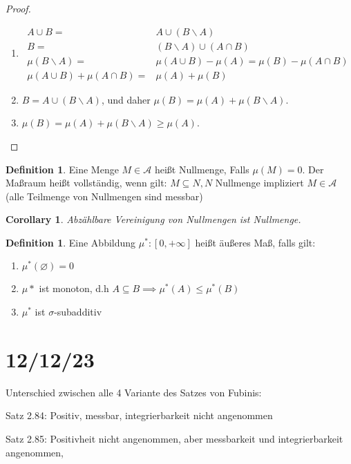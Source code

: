 \documentclass[prb,12pt]{revtex4-2}
\newtheorem{Corollary}[Theorem]{Corollary}
\theoremstyle{definition}
\theoremstyle{definition}
\newtheorem{Definition}[Theorem]{Definition}
\begin{document}
\begin{proof}
	\begin{enumerate}
		\item 
			\begin{align*}
				A \cup B=&A\cup(B\backslash A)\\
				B =& (B\backslash A)\cup (A \cap B)\\
				\mu(B\backslash A)=&\mu(A\cup B)-\mu(A)=\mu(B)-\mu(A \cap B)\\
				\mu(A\cup B)+\mu(A\cap B)=& \mu(A)+\mu(B)
			\end{align*}
		\item $B=A\cup (B\backslash A)$, und daher $\mu(B)=\mu(A)+\mu(B\backslash A)$.
		\item $\mu(B)=\mu(A)+\mu(B\backslash A)\ge \mu(A)$.
	\end{enumerate}
	\end{proof}
	\begin{Definition}
		Eine Menge $M\in \mathcal{A}$ heißt Nullmenge, Falls $\mu(M) =0$. Der Maßraum heißt vollständig, wenn gilt: $M \subseteq N, N$ Nullmenge impliziert $M\in \mathcal{A}$ (alle Teilmenge von Nullmengen sind messbar)
	\end{Definition}
	\begin{Corollary}
		Abz\"{a}hlbare Vereinigung von Nullmengen ist Nullmenge.
	\end{Corollary}
\begin{Definition}
	Eine Abbildung $\mu^*:[0,+\infty]$ heißt äußeres Maß, falls gilt:
	\begin{enumerate}
		\item $\mu^*(\varnothing)=0$ 
		\item $\mu*$ ist monoton, d.h $A\subseteq B\implies \mu^*(A)\le \mu^*(B)$ 
		\item $\mu^*$ ist $\sigma$-subadditiv
	\end{enumerate}
\end{Definition}
\section{12/12/23}
Unterschied zwischen alle 4 Variante des Satzes von Fubinis:

Satz 2.84: Positiv, messbar, integrierbarkeit nicht angenommen

Satz 2.85: Positivheit nicht angenommen, aber messbarkeit und integrierbarkeit angenommen,
\end{document}
